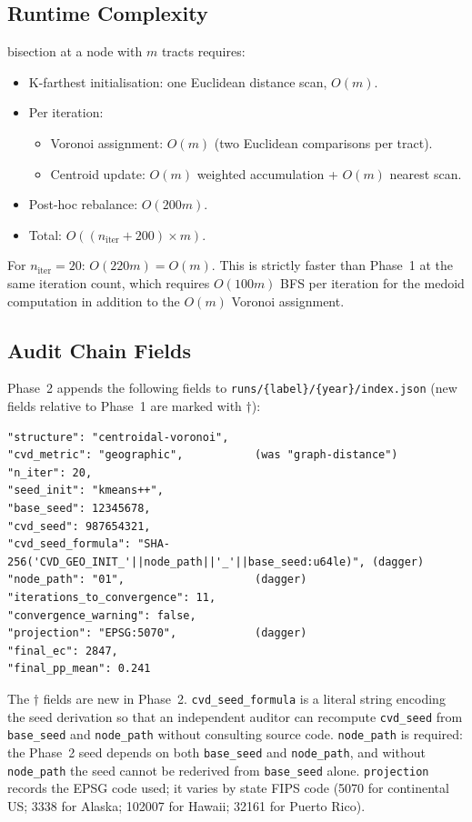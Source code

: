 \subsection{Runtime Complexity}

\begin{proposition}
\label{prop:geo-runtime}
\cvdgeo{} bisection at a node with $m$ tracts requires:
\begin{itemize}
\item K-farthest initialisation: one Euclidean distance scan, $O(m)$.
\item Per iteration:
  \begin{itemize}
  \item Voronoi assignment: $O(m)$ (two Euclidean comparisons per tract).
  \item Centroid update: $O(m)$ weighted accumulation + $O(m)$ nearest scan.
  \end{itemize}
\item Post-hoc rebalance: $O(200 m)$.
\item Total: $O((n_{\mathrm{iter}} + 200) \times m)$.
\end{itemize}
For $n_{\mathrm{iter}} = 20$: $O(220m) = O(m)$.
This is strictly faster than Phase~1 at the same iteration count, which
requires $O(100m)$ BFS per iteration for the medoid computation in addition to
the $O(m)$ Voronoi assignment.
\end{proposition}

\subsection{Audit Chain Fields}
\label{subsec:audit}

Phase~2 appends the following fields to
\texttt{runs/\{label\}/\{year\}/index.json}
(new fields relative to Phase~1 are marked with $\dagger$):

\begin{verbatim}
"structure": "centroidal-voronoi",
"cvd_metric": "geographic",           (was "graph-distance")
"n_iter": 20,
"seed_init": "kmeans++",
"base_seed": 12345678,
"cvd_seed": 987654321,
"cvd_seed_formula": "SHA-256('CVD_GEO_INIT_'||node_path||'_'||base_seed:u64le)", (dagger)
"node_path": "01",                    (dagger)
"iterations_to_convergence": 11,
"convergence_warning": false,
"projection": "EPSG:5070",            (dagger)
"final_ec": 2847,
"final_pp_mean": 0.241
\end{verbatim}

The $\dagger$ fields are new in Phase~2.
\texttt{cvd\_seed\_formula} is a literal string encoding the seed derivation
so that an independent auditor can recompute \texttt{cvd\_seed} from
\texttt{base\_seed} and \texttt{node\_path} without consulting source code.
\texttt{node\_path} is required: the Phase~2 seed depends on both \texttt{base\_seed}
and \texttt{node\_path}, and without \texttt{node\_path} the seed cannot be
rederived from \texttt{base\_seed} alone.
\texttt{projection} records the EPSG code used; it varies by state FIPS code
(5070 for continental US; 3338 for Alaska; 102007 for Hawaii; 32161 for Puerto Rico).
